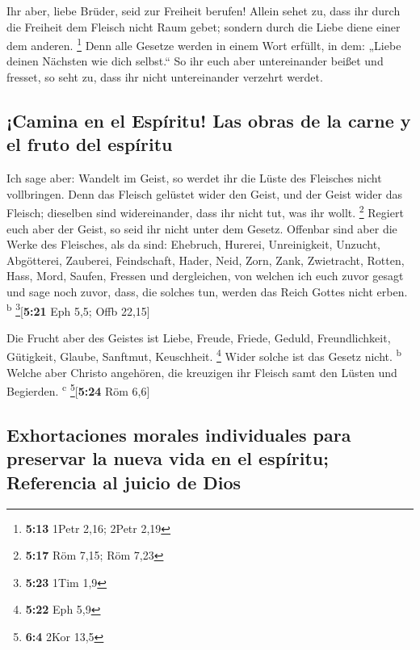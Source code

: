  Ihr aber, liebe Brüder, seid zur Freiheit berufen!
Allein sehet zu, dass ihr durch die Freiheit dem Fleisch nicht Raum
gebet; sondern durch die Liebe diene einer dem anderen. \footnote{\textbf{5:13}
  1Petr 2,16; 2Petr 2,19}  Denn alle Gesetze werden in
einem Wort erfüllt, in dem: „Liebe deinen Nächsten wie dich selbst.``
 So ihr euch aber untereinander beißet und fresset, so
seht zu, dass ihr nicht untereinander verzehrt werdet.

\hypertarget{camina-en-el-espuxedritu-las-obras-de-la-carne-y-el-fruto-del-espuxedritu}{%
\subsection{¡Camina en el Espíritu! Las obras de la carne y el fruto del
espíritu}\label{camina-en-el-espuxedritu-las-obras-de-la-carne-y-el-fruto-del-espuxedritu}}

 Ich sage aber: Wandelt im Geist, so werdet ihr die Lüste
des Fleisches nicht vollbringen.  Denn das Fleisch
gelüstet wider den Geist, und der Geist wider das Fleisch; dieselben
sind widereinander, dass ihr nicht tut, was ihr wollt. \footnote{\textbf{5:17}
  Röm 7,15; Röm 7,23}  Regiert euch aber der Geist, so
seid ihr nicht unter dem Gesetz.  Offenbar sind aber die
Werke des Fleisches, als da sind: Ehebruch, Hurerei, Unreinigkeit,
Unzucht,  Abgötterei, Zauberei, Feindschaft, Hader, Neid,
Zorn, Zank, Zwietracht, Rotten, Hass, Mord,  Saufen,
Fressen und dergleichen, von welchen ich euch zuvor gesagt und sage noch
zuvor, dass, die solches tun, werden das Reich Gottes nicht erben.
\textsuperscript{b} \footnote{\textbf{5:23} 1Tim 1,9}{[}\textbf{5:21}
Eph 5,5; Offb 22,15{]}

 Die Frucht aber des Geistes ist Liebe, Freude, Friede,
Geduld, Freundlichkeit, Gütigkeit, Glaube, Sanftmut, Keuschheit.
\footnote{\textbf{5:22} Eph 5,9}  Wider solche ist das
Gesetz nicht. \textsuperscript{b}  Welche aber Christo
angehören, die kreuzigen ihr Fleisch samt den Lüsten und Begierden.
\textsuperscript{c} \footnote{\textbf{6:4} 2Kor 13,5}{[}\textbf{5:24}
Röm 6,6{]}

\hypertarget{exhortaciones-morales-individuales-para-preservar-la-nueva-vida-en-el-espuxedritu-referencia-al-juicio-de-dios}{%
\subsection{Exhortaciones morales individuales para preservar la nueva
vida en el espíritu; Referencia al juicio de
Dios}\label{exhortaciones-morales-individuales-para-preservar-la-nueva-vida-en-el-espuxedritu-referencia-al-juicio-de-dios}}

